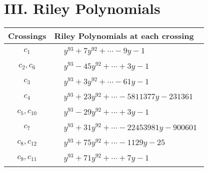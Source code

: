 \documentclass[1p]{elsarticle_modified}
\theoremstyle{definition}
\begin{document}
\centering \section*{ III. Riley Polynomials}
\begin{tabular}{m{50pt}|m{274pt}}
Crossings & \hspace{64pt}Riley Polynomials at each crossing \\
\hline $$\begin{aligned}c_{1}\end{aligned}$$&$\begin{aligned}
&y^{93}+7 y^{92}+\cdots-9 y-1
\end{aligned}$\\
\hline $$\begin{aligned}c_{2},c_{6}\end{aligned}$$&$\begin{aligned}
&y^{93}-45 y^{92}+\cdots+3 y-1
\end{aligned}$\\
\hline $$\begin{aligned}c_{3}\end{aligned}$$&$\begin{aligned}
&y^{93}+3 y^{92}+\cdots-61 y-1
\end{aligned}$\\
\hline $$\begin{aligned}c_{4}\end{aligned}$$&$\begin{aligned}
&y^{93}+23 y^{92}+\cdots-5811377 y-231361
\end{aligned}$\\
\hline $$\begin{aligned}c_{5},c_{10}\end{aligned}$$&$\begin{aligned}
&y^{93}-29 y^{92}+\cdots+3 y-1
\end{aligned}$\\
\hline $$\begin{aligned}c_{7}\end{aligned}$$&$\begin{aligned}
&y^{93}+31 y^{92}+\cdots-22453981 y-900601
\end{aligned}$\\
\hline $$\begin{aligned}c_{8},c_{12}\end{aligned}$$&$\begin{aligned}
&y^{93}+75 y^{92}+\cdots-1129 y-25
\end{aligned}$\\
\hline $$\begin{aligned}c_{9},c_{11}\end{aligned}$$&$\begin{aligned}
&y^{93}+71 y^{92}+\cdots+7 y-1
\end{aligned}$\\
\hline
\end{tabular}
\vskip 2pc
\end{document}
